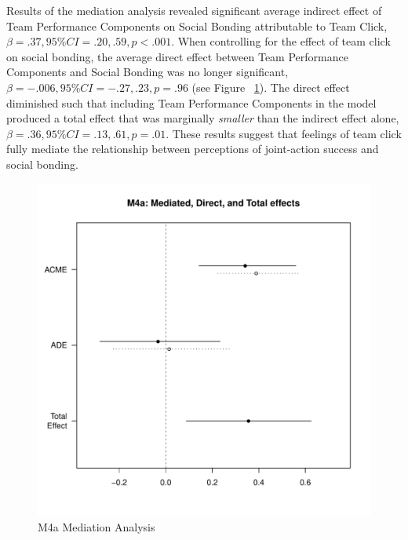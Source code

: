\begin{CJK}{UTF8}{gbsn}
  Results of the mediation analysis revealed significant average indirect effect of Team Performance Components on Social Bonding attributable to Team Click, $\beta = .37, 95\% CI = .20 , .59, p < .001$.  When controlling for the effect of team click on social bonding, the average direct effect between Team Performance Components and Social Bonding was no longer significant, $\beta = -.006, 95\% CI = -.27 , .23, p = .96 $ (see Figure ~\ref{fig:MLM4aMediationAnalysis}). The direct effect diminished such that including Team Performance Components in the model produced a total effect that was marginally \textit{smaller} than the indirect effect alone, $\beta = .36, 95\% CI = .13 , .61, p = .01$. These results suggest that feelings of team click fully mediate the relationship between perceptions of joint-action success and social bonding.



  \begin{figure}[htbp]
    \centering
    \includegraphics[scale = .5]{images/MLM4aMediationEffects.pdf}
    \caption{M4a Mediation Analysis}
    \label{fig:MLM4aMediationAnalysis}
  \end{figure}


\end{CJK}
